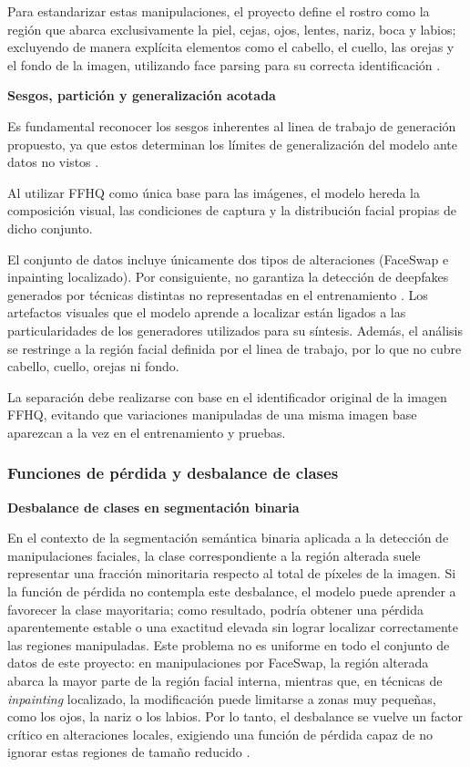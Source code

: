 Para estandarizar estas manipulaciones, el proyecto define el rostro como la región que abarca exclusivamente la piel, cejas, ojos, lentes, nariz, boca y labios; excluyendo de manera explícita elementos como el cabello, el cuello, las orejas y el fondo de la imagen, utilizando face parsing para su correcta identificación \parencite{Yu2019bisenet}.


\medskip\textbf{Sesgos, partición y generalización acotada}

Es fundamental reconocer los sesgos inherentes al linea de trabajo de generación propuesto, ya que estos determinan los límites de generalización del modelo ante datos no vistos \parencite{Yang2025, Chandra2025}. 

Al utilizar FFHQ como única base para las imágenes, el modelo hereda la composición visual, las condiciones de captura y la distribución facial propias de dicho conjunto.

El conjunto de datos incluye únicamente dos tipos de alteraciones (FaceSwap e inpainting localizado). Por consiguiente, no garantiza la detección de deepfakes generados por técnicas distintas no representadas en el entrenamiento \parencite{Alrashoud2025}. Los artefactos visuales que el modelo aprende a localizar están ligados a las particularidades de los generadores utilizados para su síntesis. Además, el análisis se restringe a la región facial definida por el linea de trabajo, por lo que no cubre cabello, cuello, orejas ni fondo.

La separación debe realizarse con base en el identificador original de la imagen FFHQ, evitando que variaciones manipuladas de una misma imagen base aparezcan a la vez en el entrenamiento y pruebas. 

\subsubsection{Funciones de pérdida y desbalance de clases}

\medskip\textbf{Desbalance de clases en segmentación binaria}

En el contexto de la segmentación semántica binaria aplicada a la detección de manipulaciones faciales, la clase correspondiente a la región alterada suele representar una fracción minoritaria respecto al total de píxeles de la imagen. Si la función de pérdida no contempla este desbalance, el modelo puede aprender a favorecer la clase mayoritaria; como resultado, podría obtener una pérdida aparentemente estable o una exactitud elevada sin lograr localizar correctamente las regiones manipuladas. Este problema no es uniforme en todo el conjunto de datos de este proyecto: en manipulaciones por FaceSwap, la región alterada abarca la mayor parte de la región facial interna, mientras que, en técnicas de \textit{inpainting} localizado, la modificación puede limitarse a zonas muy pequeñas, como los ojos, la nariz o los labios. Por lo tanto, el desbalance se vuelve un factor crítico en alteraciones locales, exigiendo una función de pérdida capaz de no ignorar estas regiones de tamaño reducido \parencite{Li2025, Hu2024, Azad2023}.

